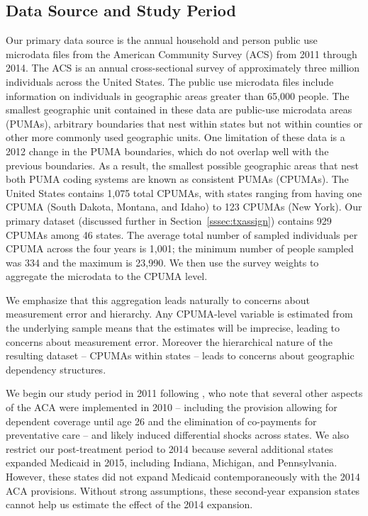 \documentclass[aoas]{imsart}
\theoremstyle{plain}
\theoremstyle{remark}
\begin{document}
\subsection{Data Source and Study Period}\label{ssec:data}

Our primary data source is the annual household and person public use microdata files from the American Community Survey (ACS) from 2011 through 2014. The ACS is an annual cross-sectional survey of approximately three million individuals across the United States. The public use microdata files include information on individuals in geographic areas greater than 65,000 people. The smallest geographic unit contained in these data are public-use microdata areas (PUMAs), arbitrary boundaries that nest within states but not within counties or other more commonly used geographic units. One limitation of these data is a 2012 change in the PUMA boundaries, which do not overlap well with the previous boundaries. As a result, the smallest possible geographic areas that nest both PUMA coding systems are known as consistent PUMAs (CPUMAs). The United States contains 1,075 total CPUMAs, with states ranging from having one CPUMA (South Dakota, Montana, and Idaho) to 123 CPUMAs (New York). Our primary dataset (discussed further in Section~\ref{sssec:txassign}) contains 929 CPUMAs among 46 states. The average total number of sampled individuals per CPUMA across the four years is 1,001; the minimum number of people sampled was 334 and the maximum is 23,990. We then use the survey weights to aggregate the microdata to the CPUMA level.  

We emphasize that this aggregation leads naturally to concerns about measurement error and hierarchy. Any CPUMA-level variable is estimated from the underlying sample means that the estimates will be imprecise, leading to concerns about measurement error. Moreover the hierarchical nature of the resulting dataset -- CPUMAs within states -- leads to concerns about geographic dependency structures.

We begin our study period in 2011 following \cite{courtemanche2017early}, who note that several other aspects of the ACA were implemented in 2010 -- including the provision allowing for dependent coverage until age 26 and the elimination of co-payments for preventative care -- and likely induced differential shocks across states. We also restrict our post-treatment period to 2014 because several additional states expanded Medicaid in 2015, including Indiana, Michigan, and Pennsylvania. However, these states did not expand Medicaid contemporaneously with the 2014 ACA provisions. Without strong assumptions, these second-year expansion states cannot help us estimate the effect of the 2014 expansion. 
\end{document}
